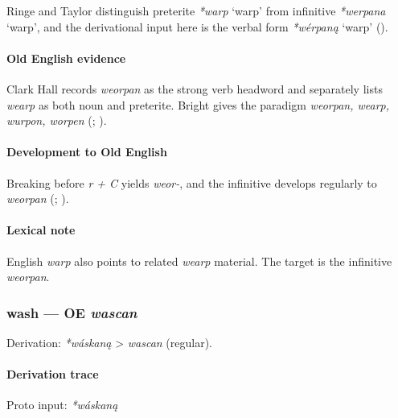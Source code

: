 \documentclass[
  british,
  a4paper,
]{article}
\providecommand{\Recon}[1]{\emph{*#1}}
\begin{document}
Ringe and Taylor distinguish preterite \Recon{warp} `warp' from
infinitive \Recon{werpana} `warp', and the derivational input here is
the verbal form \Recon{wérpaną} `warp'
().

\paragraph{Old English evidence}\label{old-english-evidence-73}

Clark Hall records \emph{weorpan} as the strong verb headword and
separately lists \emph{wearp} as both noun and preterite. Bright gives
the paradigm \emph{weorpan, wearp, wurpon, worpen}
(;
).

\paragraph{Development to Old
English}\label{development-to-old-english-72}

Breaking before \emph{r + C} yields \emph{weor-}, and the infinitive
develops regularly to \emph{weorpan}
(;
).

\paragraph{Lexical note}\label{lexical-note-2}

English \emph{warp} also points to related \emph{wearp} material. The
target is the infinitive \emph{weorpan}.

\subsubsection{\texorpdfstring{wash --- OE
\emph{wascan}}{wash --- OE wascan}}\label{wash-oe-wascan}

Derivation: \emph{*wáskaną} \textgreater{} \emph{wascan} (regular).

\paragraph{Derivation trace}\label{derivation-trace-91}

Proto input: \emph{*wáskaną}

\begingroup
\setlength{\fboxsep}{6pt}
\end{document}
